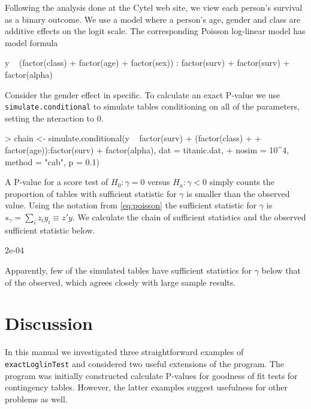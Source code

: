 \documentclass[a4paper]{article}
\begin{document}
Following the analysis done at the Cytel web site, we view each
person's survival as a binary outcome. We use a model where a person's
age, gender and class are additive effects on the logit scale. 
The corresponding Poisson log-linear model has model formula
\begin{Schunk}
\begin{Soutput}
y ~ (factor(class) + factor(age) + factor(sex)) : factor(surv) + factor(surv) + factor(alpha)
\end{Soutput}
\end{Schunk}

 Consider the gender effect in specific. To calculate an exact
P-value we use \texttt{simulate.conditional} to
simulate tables conditioning on all of the parameters, setting the  
 nteraction to 0.
\begin{Schunk}
\begin{Sinput}
> chain <- simulate.conditional(y ~ factor(surv) + (factor(class) + 
+     factor(age)):factor(surv) + factor(alpha), dat = titanic.dat, 
+     nosim = 10^4, method = "cab", p = 0.1)
\end{Sinput}
\end{Schunk}

A P-value for a score test of $H_0 : \gamma = 0$ versus $H_a : \gamma
< 0$ simply counts the proportion of tables with sufficient statistic
for $\gamma$ is smaller than the observed value. Using the notation
from \eqref{eq:poisson} the sufficient statistic for $\gamma$ is
$s_\gamma = \sum_i z_i y_i \equiv z' y$. We calculate the chain of
sufficient statistics and the observed sufficient statistic below.
\begin{Schunk}
\begin{Soutput}
[1] 2e-04
\end{Soutput}
\end{Schunk}
Apparently, few of the simulated tables have sufficient statistics
for $\gamma$ below that of the observed, which agrees closely with
large sample results.

\section{Discussion}
In this manual we investigated three straightforward examples of
\texttt{exactLoglinTest} and considered two useful extensions of the
program. The program was initially constructed calculate P-values for
goodness of fit tests for contingency tables. However, the latter
examples suggest usefulness for other problems as well.
\end{document}
